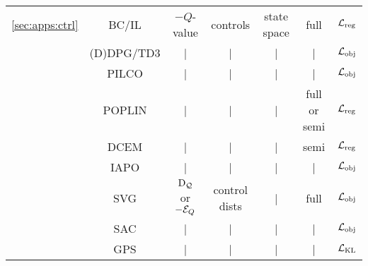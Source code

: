 {\begin{tabular}{ccccccc}
\ref{sec:apps:ctrl} & BC/IL & $-Q$-value & controls & state space & full & ${\mathcal{L}}_{\rm reg}$ \\
& (D)DPG/TD3 & | & | & | & | & ${\mathcal{L}}_{\rm obj}$ \\
& PILCO & | & | & | & | & ${\mathcal{L}}_{\rm obj}$ \\
& POPLIN & | & | & | & full or semi & ${\mathcal{L}}_{\rm reg}$ \\
& DCEM & | & | & | & semi & ${\mathcal{L}}_{\rm reg}$ \\
& IAPO & | & | & | & | & ${\mathcal{L}}_{\rm obj}$ \\
& SVG & $\mathrm{D}_{\mathcal{Q}}$ or $-{\mathcal{E}}_Q$ & control dists & | & full & ${\mathcal{L}}_{\rm obj}$ \\
& SAC & | & | & | & | & ${\mathcal{L}}_{\rm obj}$ \\
& GPS & | & | & | & | & ${\mathcal{L}}_{\rm KL}$ \\
\bottomrule
\end{tabular}}

